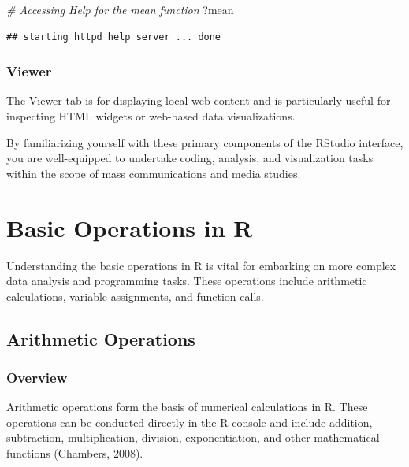 \documentclass[
  b5paper]{book}
\newenvironment{Shaded}{\begin{snugshade}}{\end{snugshade}}
\newcommand{\CommentTok}[1]{\textcolor[rgb]{0.56,0.35,0.01}{\textit{#1}}}
\newcommand{\NormalTok}[1]{#1}
\begin{document}
\begin{Shaded}
\begin{Highlighting}[]
\CommentTok{\# Accessing Help for the \textquotesingle{}mean\textquotesingle{} function}
\NormalTok{?mean}
\end{Highlighting}
\end{Shaded}

\begin{verbatim}
## starting httpd help server ... done
\end{verbatim}

\hypertarget{viewer}{%
\subsubsection*{Viewer}\label{viewer}}

The Viewer tab is for displaying local web content and is particularly useful for inspecting HTML widgets or web-based data visualizations.

By familiarizing yourself with these primary components of the RStudio interface, you are well-equipped to undertake coding, analysis, and visualization tasks within the scope of mass communications and media studies.

\hypertarget{basic-operations-in-r}{%
\section{Basic Operations in R}\label{basic-operations-in-r}}

Understanding the basic operations in R is vital for embarking on more complex data analysis and programming tasks. These operations include arithmetic calculations, variable assignments, and function calls.

\hypertarget{arithmetic-operations}{%
\subsection*{Arithmetic Operations}\label{arithmetic-operations}}

\hypertarget{overview-1}{%
\subsubsection*{Overview}\label{overview-1}}

Arithmetic operations form the basis of numerical calculations in R. These operations can be conducted directly in the R console and include addition, subtraction, multiplication, division, exponentiation, and other mathematical functions (Chambers, 2008).
\end{document}
